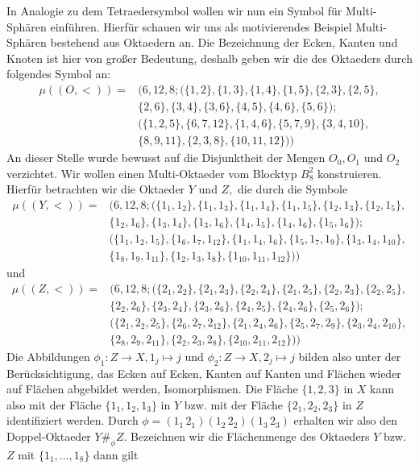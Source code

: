 \documentclass[12pt,titlepage,twoside,cleardoublepage]{article}
\theoremstyle{nummermitklammern}
\numberwithin{equation}{section}
\begin{document}
In Analogie zu dem Tetraedersymbol wollen wir nun ein Symbol für Multi-Sphären einführen. 
Hierfür schauen wir uns als motivierendes Beispiel Multi-Sphären bestehend aus Oktaedern an. Die Bezeichnung der Ecken, Kanten und Knoten ist hier von großer Bedeutung, deshalb geben wir die des Oktaeders durch folgendes Symbol an:
\begin{align*}
 \mu((O,<))=&(6,12,8;(\{1,2\},\{1,3\},\{1,4\},\{1,5\},\{2,3\},\{2,5\},\\
 &\{2,6\},\{3,4\},\{3,6\},\{4,5\},\{4,6\},\{5,6\});\\
 &(\{1,2,5\},\{6,7,12\},\{1,4,6\},\{5,7,9\},\{3,4,10\},\\&\{8,9,11\},\{2,3,8\},\{10,11,12\}))
 \end{align*}
 An dieser Stelle wurde bewusst auf die Disjunktheit der Mengen $O_0,O_1$ und $O_2$ verzichtet.
  Wir wollen einen Multi-Oktaeder vom Blocktyp $B_8^2$ konstruieren. Hierfür betrachten wir die Oktaeder $Y$ und $Z,$ die durch die Symbole 
\begin{align*}
 \mu((Y,<))=&(6,12,8;(\{1_1,1_2\},\{1_1,1_3\},\{1_1,1_4\},\{1_1,1_5\},\{1_2,1_3\},\{1_2,1_5\},\\
 &\{1_2,1_6\},\{1_3,1_4\},\{1_3,1_6\},\{1_4,1_5\},\{1_4,1_6\},\{1_5,1_6\});\\
 &(\{1_1,1_2,1_5\},\{1_6,1_7,1_{12}\},\{1_1,1_4,1_6\},\{1_5,1_7,1_9\},\{1_3,1_4,1_{10}\},\\&\{1_8,1_9,1_{11}\},\{1_2,1_3,1_8\},\{1_{10},1_{11},1_{12}\}))
 \end{align*}
und 
\begin{align*}
 \mu((Z,<))=&(6,12,8;(\{2_1,2_2\},\{2_1,2_3\},\{2_2,2_4\},\{2_1,2_5\},\{2_2,2_3\},\{2_2,2_5\},\\
 &\{2_2,2_6\},\{2_3,2_4\},\{2_3,2_6\},\{2_4,2_5\},\{2_4,2_6\},\{2_5,2_6\});\\
 &(\{2_1,2_2,2_5\},\{2_6,2_7,2_{12}\},\{2_1,2_4,2_6\},\{2_5,2_7,2_9\},\{2_3,2_4,2_{10}\},\\&\{2_8,2_9,2_{11}\},\{2_2,2_3,2_8\},\{2_{10},2_{11},2_{12}\}))
 \end{align*}
 Die Abbildungen $\phi_1:Z\to X,1_j \mapsto j$ und $\phi_2:Z\to X,2_j \mapsto j$ bilden also unter der Berücksichtigung, das Ecken auf Ecken, Kanten auf Kanten und Flächen wieder auf Flächen abgebildet werden, Isomorphismen. Die Fläche $\{1,2,3\}$ in $X$ kann also mit der Fläche $\{1_1,1_2,1_3\}$ in $Y$ bzw. mit der Fläche $\{2_1,2_2,2_3\}$ in $Z$ identifiziert werden. Durch $\phi=(1_1\, 2_1) (1_2\, 2_2) (1_3\, 2_3)$ erhalten wir also den Doppel-Oktaeder $Y\#_{\phi} Z.$ Bezeichnen wir die Flächenmenge des Oktaeders $Y$ bzw. $Z$ mit $\{1_1,\ldots,1_8\}$ dann gilt
\end{document}
